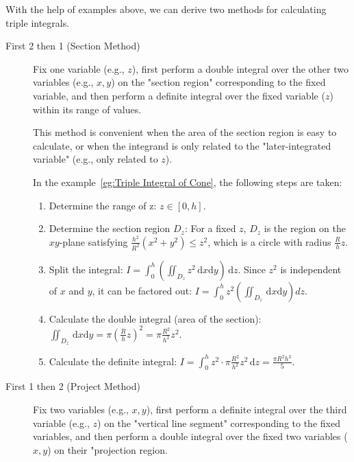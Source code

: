 \documentclass[11pt]{../../TexTemplate/elegantbook}
\begin{document}
\vspace{1cm}
With the help of examples above, we can derive two methods for calculating triple integrals.

\begin{description}
\item[First 2 then 1 (Section Method)] 
Fix one variable (e.g., \(z\)), first perform a double integral over the other two variables (e.g., \(x,y\)) 
on the "section region" corresponding to the fixed variable, 
and then perform a definite integral over the fixed variable (\(z\)) within its range of values.

This method is convenient when the area of the section region is easy to calculate, 
or when the integrand is only related to the "later-integrated variable" (e.g., only related to \(z\)).

In the example~\ref{eg:Triple Integral of Cone}, the following steps are taken:
\begin{enumerate}
    \item Determine the range of z: \(z \in [0, h]\). 
    \item Determine the section region \(D_z\): 
        For a fixed \(z\), \(D_z\) is the region on the \(xy\)-plane satisfying \(\frac{h^2}{R^2}(x^2 + y^2) \leqslant z^2\), 
        which is a circle with radius \(\frac{R}{h}z\).
    \item Split the integral: \(I = \int_{0}^{h} \left( \iint_{D_z} z^2 \,\mathrm{d}x\mathrm{d}y \right) \,\mathrm{d}z\). 
        Since \(z^2\) is independent of \(x\) and \(y\), it can be factored out:
        \(I = \int_{0}^{h} z^2 \left( \iint_{D_z} \,\mathrm{d}x\mathrm{d}y \right) dz\).
    \item Calculate the double integral (area of the section): 
        \(\iint_{D_z} \,\mathrm{d}x\mathrm{d}y = \pi \left( \frac{R}{h}z \right)^2 = \pi \frac{R^2}{h^2} z^2\).
    \item Calculate the definite integral: 
        \(I = \int_{0}^{h} z^2 \cdot \pi \frac{R^2}{h^2} z^2 \,\mathrm{d}z = \frac{\pi R^2 h^3}{5}\).
\end{enumerate}

\item[First 1 then 2 (Project Method)]
Fix two variables (e.g., \(x,y\)), first perform a definite integral over the third variable (e.g., \(z\)) 
on the "vertical line segment" corresponding to the fixed variables, 
and then perform a double integral over the fixed two variables ( \(x,y\)) on their "projection region. 


\end{description}
\end{document}
